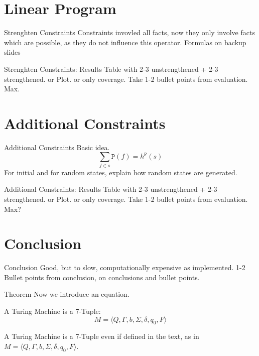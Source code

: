 \documentclass[aspectratio=169]{beamer}
\begin{document}
    \section{Linear Program}
    \begin{frame}[t]{Strenghten Constraints}
        Constraints invovled all facts, now they only involve facts which are possible, as they do not influence this operator.
        Formulas on backup slides
    \end{frame}

    \begin{frame}[t]{Strenghten Constraints: Results}
        Table with 2-3 unstrengthened + 2-3 strengthened. or Plot. or only coverage.
        Take 1-2 bullet points from evaluation.
        Max.
    \end{frame}


    \section{Additional Constraints}
    \begin{frame}[c]{Additional Constraints}
        Basic idea.
        \[\sum_{f\in s}\mathtt{P}(f)=h^\mathtt{P}(s)\]
        For initial and for random states, explain how random states are generated.
    \end{frame}

    \begin{frame}[c]{Additional Constraints: Results}
        Table with 2-3 unstrengthened + 2-3 strengthened. or Plot. or only coverage.
        Take 1-2 bullet points from evaluation.
        Max?
    \end{frame}

    \section{Conclusion}
    \begin{frame}[t]{Conclusion}
        Good, but to slow, computationally expensive as implemented.
        1-2 Bullet points from conclusion, on conclusions and bullet points.
    \end{frame}


    \begin{frame}[t,plain]
    \end{frame}

    \backupbegin

    \begin{frame}[c]{Theorem}
        Now we introduce an equation.
        \begin{theorem}
            A Turing Machine is a 7-Tuple:
            \begin{equation}
                M = \langle Q, \Gamma, b, \Sigma, \delta, q_0, F \rangle
            \end{equation}
        \end{theorem}
        A Turing Machine is a 7-Tuple even if defined in the text, as in $M = \langle Q, \Gamma, b, \Sigma, \delta, q_0, F \rangle$.
    \end{frame}

    \backupend
\end{document}
